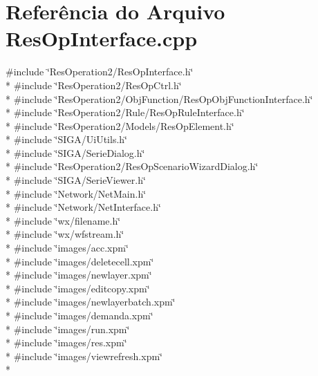 \section{Referência do Arquivo Res\+Op\+Interface.\+cpp}
\label{_2_res_op_interface_8cpp}
{\ttfamily \#include \char`\"{}Res\+Operation2/\+Res\+Op\+Interface.\+h\char`\"{}}\\*
{\ttfamily \#include \char`\"{}Res\+Operation2/\+Res\+Op\+Ctrl.\+h\char`\"{}}\\*
{\ttfamily \#include \char`\"{}Res\+Operation2/\+Obj\+Function/\+Res\+Op\+Obj\+Function\+Interface.\+h\char`\"{}}\\*
{\ttfamily \#include \char`\"{}Res\+Operation2/\+Rule/\+Res\+Op\+Rule\+Interface.\+h\char`\"{}}\\*
{\ttfamily \#include \char`\"{}Res\+Operation2/\+Models/\+Res\+Op\+Element.\+h\char`\"{}}\\*
{\ttfamily \#include \char`\"{}S\+I\+G\+A/\+Ui\+Utils.\+h\char`\"{}}\\*
{\ttfamily \#include \char`\"{}S\+I\+G\+A/\+Serie\+Dialog.\+h\char`\"{}}\\*
{\ttfamily \#include \char`\"{}Res\+Operation2/\+Res\+Op\+Scenario\+Wizard\+Dialog.\+h\char`\"{}}\\*
{\ttfamily \#include \char`\"{}S\+I\+G\+A/\+Serie\+Viewer.\+h\char`\"{}}\\*
{\ttfamily \#include \char`\"{}Network/\+Net\+Main.\+h\char`\"{}}\\*
{\ttfamily \#include \char`\"{}Network/\+Net\+Interface.\+h\char`\"{}}\\*
{\ttfamily \#include \char`\"{}wx/filename.\+h\char`\"{}}\\*
{\ttfamily \#include \char`\"{}wx/wfstream.\+h\char`\"{}}\\*
{\ttfamily \#include \char`\"{}images/acc.\+xpm\char`\"{}}\\*
{\ttfamily \#include \char`\"{}images/deletecell.\+xpm\char`\"{}}\\*
{\ttfamily \#include \char`\"{}images/newlayer.\+xpm\char`\"{}}\\*
{\ttfamily \#include \char`\"{}images/editcopy.\+xpm\char`\"{}}\\*
{\ttfamily \#include \char`\"{}images/newlayerbatch.\+xpm\char`\"{}}\\*
{\ttfamily \#include \char`\"{}images/demanda.\+xpm\char`\"{}}\\*
{\ttfamily \#include \char`\"{}images/run.\+xpm\char`\"{}}\\*
{\ttfamily \#include \char`\"{}images/res.\+xpm\char`\"{}}\\*
{\ttfamily \#include \char`\"{}images/viewrefresh.\+xpm\char`\"{}}\\*
